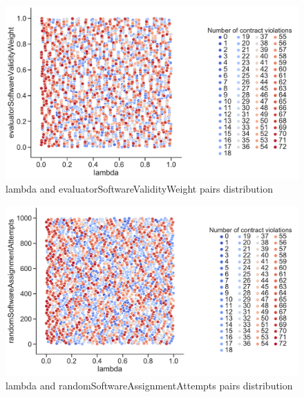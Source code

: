 \begin{figure}
	\centering
	\includegraphics[width=\textwidth]{images/PairsDistr/lambda_evaluatorSoftwareValidityWeight.pdf}
	\caption[lambda and evaluatorSoftwareValidityWeight pairs distribution]{lambda and evaluatorSoftwareValidityWeight pairs distribution}
	\label{fig:lambda_evaluatorSoftwareValidityWeight_pair}
\end{figure}
\clearpage
\begin{figure}
	\centering
	\includegraphics[width=\textwidth]{images/PairsDistr/lambda_randomSoftwareAssignmentAttempts.pdf}
	\caption[lambda and randomSoftwareAssignmentAttempts pairs distribution]{lambda and randomSoftwareAssignmentAttempts pairs distribution}
	\label{fig:lambda_randomSoftwareAssignmentAttempts_pair}
\end{figure}
\clearpage
